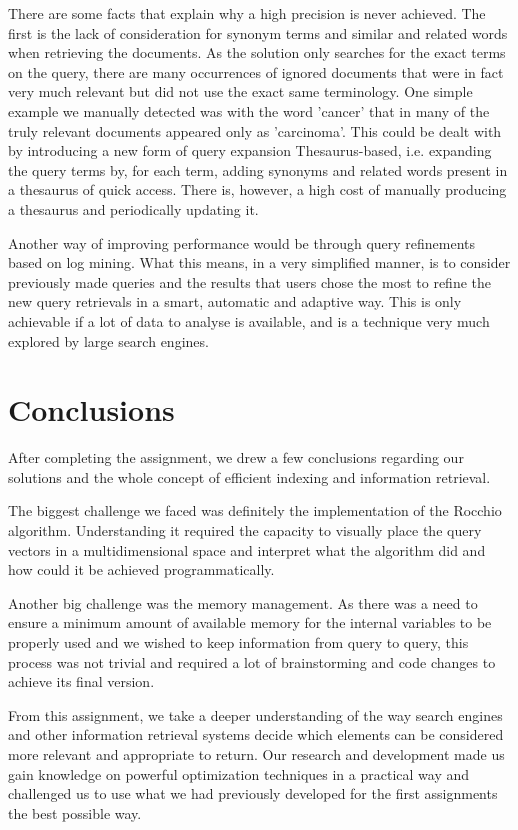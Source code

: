 \documentclass[12pt]{article}
\begin{document}
\newpage
There are some facts that explain why a high precision is never achieved.
The first is the lack of consideration for synonym terms and similar and related 
words when retrieving the documents.
As the solution only searches for the exact terms on the query, there are many
occurrences of ignored documents that were in fact very much relevant but did not
use the exact same terminology.
One simple example we manually detected was with the word 'cancer' that in many 
of the truly relevant documents appeared only as 'carcinoma'.
This could be dealt with by introducing a new form of query expansion Thesaurus-based,
i.e. expanding the query terms by, for each term, adding synonyms and related words
present in a thesaurus of quick access.
There is, however, a high cost of manually producing a thesaurus and periodically 
updating it.

Another way of improving performance would be through query refinements based on
log mining.
What this means, in a very simplified manner, is to consider previously made
queries and the results that users chose the most to refine the new query retrievals
in a smart, automatic and adaptive way.
This is only achievable if a lot of data to analyse is available, and is a technique
very much explored by large search engines.

\newpage
\section{Conclusions}

After completing the assignment, we drew a few conclusions regarding our
solutions and the whole concept of efficient indexing and information retrieval.

The biggest challenge we faced was definitely the implementation of the Rocchio 
algorithm.
Understanding it required the capacity to visually place the query vectors in a 
multidimensional space and interpret what the algorithm did and how could it be 
achieved programmatically. 

Another big challenge was the memory management.
As there was a need to ensure a minimum amount of available memory for the internal
variables to be properly used and we wished to keep information from query to query,
this process was not trivial and required a lot of brainstorming and code changes 
to achieve its final version.

From this assignment, we take a deeper understanding of the way search engines 
and other information retrieval systems decide which elements can be considered
more relevant and appropriate to return.
Our research and development made us gain knowledge on powerful optimization 
techniques in a practical way and challenged us to use what we had previously
developed for the first assignments the best possible way.
\end{document}
